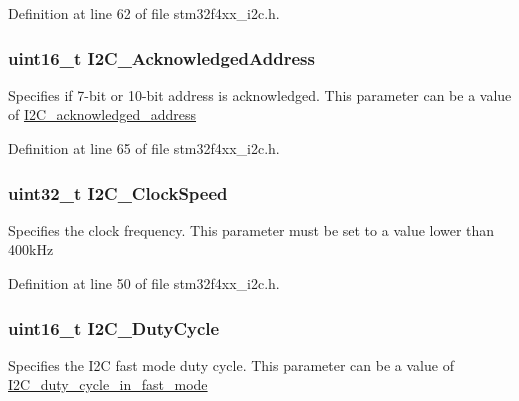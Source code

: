Definition at line 62 of file stm32f4xx\-\_\-i2c.\-h.

\hypertarget{struct_i2_c___init_type_def_af46be2bc866a7dbf0d529dd770b105b3}{
\subsubsection[{I2\-C\-\_\-\-Acknowledged\-Address}]{\setlength{\rightskip}{0pt plus 5cm}uint16\-\_\-t I2\-C\-\_\-\-Acknowledged\-Address}}\label{struct_i2_c___init_type_def_af46be2bc866a7dbf0d529dd770b105b3}
Specifies if 7-\/bit or 10-\/bit address is acknowledged. This parameter can be a value of \hyperlink{group___i2_c__acknowledged__address}{I2\-C\-\_\-acknowledged\-\_\-address} 

Definition at line 65 of file stm32f4xx\-\_\-i2c.\-h.

\hypertarget{struct_i2_c___init_type_def_af8d72d15cd29b7e69591ce3edab497f6}{
\subsubsection[{I2\-C\-\_\-\-Clock\-Speed}]{\setlength{\rightskip}{0pt plus 5cm}uint32\-\_\-t I2\-C\-\_\-\-Clock\-Speed}}\label{struct_i2_c___init_type_def_af8d72d15cd29b7e69591ce3edab497f6}
Specifies the clock frequency. This parameter must be set to a value lower than 400k\-Hz 

Definition at line 50 of file stm32f4xx\-\_\-i2c.\-h.

\hypertarget{struct_i2_c___init_type_def_a349afc2bb8534c072349a6061f29344a}{
\subsubsection[{I2\-C\-\_\-\-Duty\-Cycle}]{\setlength{\rightskip}{0pt plus 5cm}uint16\-\_\-t I2\-C\-\_\-\-Duty\-Cycle}}\label{struct_i2_c___init_type_def_a349afc2bb8534c072349a6061f29344a}
Specifies the I2\-C fast mode duty cycle. This parameter can be a value of \hyperlink{group___i2_c__duty__cycle__in__fast__mode}{I2\-C\-\_\-duty\-\_\-cycle\-\_\-in\-\_\-fast\-\_\-mode} 

